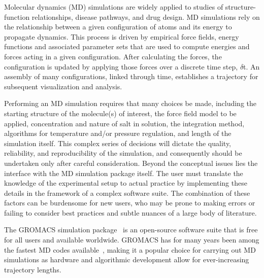\documentclass[9pt,tutorial,pubversion]{livecoms}
\begin{document}


Molecular dynamics (MD) simulations are widely applied to studies of structure-function relationships, disease pathways, and drug design. MD simulations rely on the relationship between a given configuration of atoms and its energy to propagate dynamics. This process is driven by empirical force fields, energy functions and associated parameter sets that are used to compute energies and forces acting in a given configuration. After calculating the forces, the configuration is updated by applying those forces over a discrete time step, $\delta$t. An assembly of many configurations, linked through time, establishes a trajectory for subsequent visualization and analysis.

Performing an MD simulation requires that many choices be made, including the starting structure of the molecule(s) of interest, the force field model to be applied, concentration and nature of salt in solution, the integration method, algorithms for temperature and/or pressure regulation, and length of the simulation itself. This complex series of decisions will dictate the quality, reliability, and reproducibility of the simulation, and consequently should be undertaken only after careful consideration. Beyond the conceptual issues lies the interface with the MD simulation package itself. The user must translate the knowledge of the experimental setup to actual practice by implementing these details in the framework of a complex software suite. The combination of these factors can be burdensome for new users, who may be prone to making errors or failing to consider best practices and subtle nuances of a large body of literature.

The GROMACS simulation package~\cite{Hess2008,Abraham2015} is an open-source software suite that is free for all users and available worldwide. GROMACS has for many years been among the fastest MD codes available~\cite{Hess2008}, making it a popular choice for carrying out MD simulations as hardware and algorithmic development allow for ever-increasing trajectory lengths.
\end{document}
